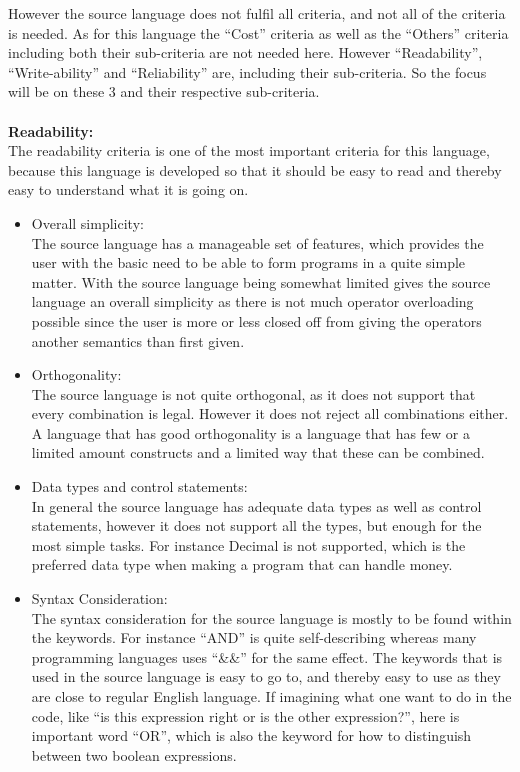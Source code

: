 However the source language does not fulfil all criteria, and not all of the criteria is needed. As for this language the ``Cost'' criteria as well as the ``Others'' criteria including both their sub-criteria are not needed here. However ``Readability'', ``Write-ability'' and ``Reliability'' are, including their sub-criteria. So the focus will be on these 3 and their respective sub-criteria. \\ \\
\textbf{Readability:} \\
The readability criteria is one of the most important criteria for this language, because this language is developed so that it should be easy to read and thereby easy to understand what it is going on. \\
\begin{itemize}
\item Overall simplicity:\\
The source language has a manageable set of features, which provides the user with the basic need to be able to form programs in a quite simple matter. With the source language being somewhat limited gives the source language an overall simplicity as there is not much operator overloading possible since the user is more or less closed off from giving the operators another semantics than first given. 
\item Orthogonality:\\
The source language is not quite orthogonal, as it does not support that every combination is legal. However it does not reject all combinations either. A language that has good orthogonality is a language that has few or a limited amount constructs and a limited way that these can be combined. 
\item Data types and control statements:\\
In general the source language has adequate data types as well as control statements, however it does not support all the types, but enough for the most simple tasks. For instance Decimal is not supported, which is the preferred data type when making a program that can handle money. 
\item Syntax Consideration:\\
The syntax consideration for the source language is mostly to be found within the keywords. For instance ``AND'' is quite self-describing whereas many programming languages uses ``\&\&'' for the same effect. The keywords that is used in the source language is easy to go to, and thereby easy to use as they are close to regular English language. If imagining what one want to do in the code, like ``is this expression right or is the other expression?'', here is important word ``OR'', which is also the keyword for how to distinguish between two boolean expressions.\\ 
\end{itemize}


